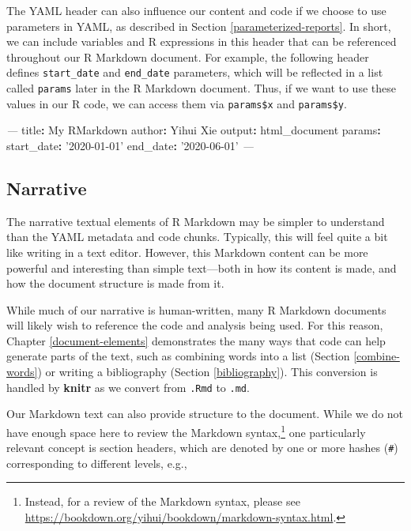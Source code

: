 \documentclass[
  11pt,
]{krantz}
\newenvironment{Shaded}{\begin{snugshade}}{\end{snugshade}}
\newcommand{\AttributeTok}[1]{\textcolor[rgb]{0.61,0.61,0.61}{#1}}
\newcommand{\FunctionTok}[1]{\textcolor[rgb]{0,0,0}{#1}}
\newcommand{\KeywordTok}[1]{\textcolor[rgb]{0.27,0.27,0.27}{\textbf{#1}}}
\newcommand{\PreprocessorTok}[1]{\textcolor[rgb]{0.37,0.37,0.37}{\textit{#1}}}
\newcommand{\StringTok}[1]{\textcolor[rgb]{0.5,0.5,0.5}{#1}}
\begin{document}
The YAML header can also influence our content and code if we choose to use parameters in YAML, as described in Section \ref{parameterized-reports}. In short, we can include variables and R expressions in this header that can be referenced throughout our R Markdown document. For example, the following header defines \texttt{start\_date} and \texttt{end\_date} parameters, which will be reflected in a list called \texttt{params} later in the R Markdown document. Thus, if we want to use these values in our R code, we can access them via \texttt{params\$x} and \texttt{params\$y}.

\begin{Shaded}
\begin{Highlighting}[]
\PreprocessorTok{---}
\FunctionTok{title}\KeywordTok{:}\AttributeTok{ My RMarkdown}
\FunctionTok{author}\KeywordTok{:}\AttributeTok{ Yihui Xie}
\FunctionTok{output}\KeywordTok{:}\AttributeTok{ html_document}
\FunctionTok{params}\KeywordTok{:}
\AttributeTok{  }\FunctionTok{start_date}\KeywordTok{:}\AttributeTok{ }\StringTok{'2020-01-01'}
\AttributeTok{  }\FunctionTok{end_date}\KeywordTok{:}\AttributeTok{ }\StringTok{'2020-06-01'}
\PreprocessorTok{---}
\end{Highlighting}
\end{Shaded}

\hypertarget{narrative}{%
\subsection{Narrative}\label{narrative}}

The narrative textual elements of R Markdown may be simpler to understand than the YAML metadata and code chunks. Typically, this will feel quite a bit like writing in a text editor. However, this Markdown content can be more powerful and interesting than simple text---both in how its content is made, and how the document structure is made from it.

While much of our narrative is human-written, many R Markdown documents will likely wish to reference the code and analysis being used. For this reason, Chapter \ref{document-elements} demonstrates the many ways that code can help generate parts of the text, such as combining words into a list (Section \ref{combine-words}) or writing a bibliography (Section \ref{bibliography}). This conversion is handled by \textbf{knitr} as we convert from \texttt{.Rmd} to \texttt{.md}.

Our Markdown text can also provide structure to the document. While we do not have enough space here to review the Markdown syntax,\footnote{Instead, for a review of the Markdown syntax, please see \url{https://bookdown.org/yihui/bookdown/markdown-syntax.html}.} one particularly relevant concept is section headers, which are denoted by one or more hashes (\texttt{\#}) corresponding to different levels, e.g.,
\end{document}
